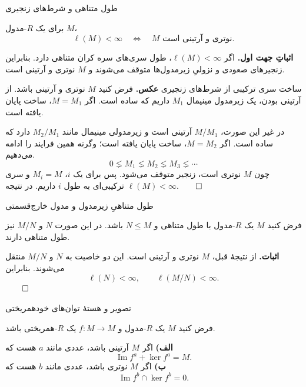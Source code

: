 \begin{frame}[t]{طول متناهی و شرط‌های زنجیری}
  \label{lec13:finite-length-chain-conditions}
  \begin{theorem}
    برای یک $R$-مدول $M$،
    \[
      \ell(M)<\infty
      \quad\Longleftrightarrow\quad
      M\text{ نوتری و آرتینی است.}
    \]
  \end{theorem}
  \textbf{اثباتِ جهت اول.}
  اگر $\ell(M)<\infty$، طول سری‌های سره کران متناهی دارد.
  بنابراین زنجیرهای صعودی و نزولیِ زیرمدول‌ها متوقف می‌شوند و $M$ نوتری و آرتینی است.
\end{frame}

\begin{frame}[t]{ساخت سری ترکیبی از شرط‌های زنجیری}
  \label{lec13:chain-conditions-converse}
  \textbf{عکس.} فرض کنید $M$ نوتری و آرتینی باشد.
  از آرتینی بودن، یک زیرمدول مینیمال $M_1$ داریم که ساده است.
  اگر $M=M_1$، ساخت پایان یافته است.
  \par\medskip
  در غیر این صورت، $M/M_1$ آرتینی است و زیرمدولی مینیمال مانند
  $M_2/M_1$ دارد که ساده است. اگر $M=M_2$، ساخت پایان یافته است؛
  وگرنه همین فرایند را ادامه می‌دهیم.
  \[
    0\lneq M_1\lneq M_2\lneq M_3\lneq\cdots
  \]
  چون $M$ نوتری است، زنجیر متوقف می‌شود. پس برای یک $i$، $M_i=M$ و
  سری ترکیبی‌ای به طول $i$ داریم. در نتیجه $\ell(M)<\infty$.\hfill$\qed$
\end{frame}

\begin{frame}[t]{طول متناهیِ زیرمدول و مدول خارج‌قسمتی}
  \label{lec13:finite-length-subquotients}
  \begin{corollary}
    فرض کنید $M$ یک $R$-مدول با طول متناهی و $N\leqslant M$ باشد.
    در این صورت $N$ و $M/N$ نیز طول متناهی دارند.
  \end{corollary}
  \textbf{اثبات.} از نتیجهٔ قبل، $M$ نوتری و آرتینی است.
  این دو خاصیت به $N$ و $M/N$ منتقل می‌شوند. بنابراین
  \[
    \ell(N)<\infty,
    \qquad
    \ell(M/N)<\infty.
  \]
  \hfill$\qed$
\end{frame}

\begin{frame}[t]{تصویر و هستهٔ توان‌های خودهمریختی}
  \label{lec13:eventual-image-kernel}
  \begin{theorem}
    فرض کنید $M$ یک $R$-مدول و $f:M\longrightarrow M$ یک $R$-همریختی باشد.
    \par\medskip
    \textbf{الف)} اگر $M$ آرتینی باشد، عددی مانند $a$ هست که
    \[
      \operatorname{Im}f^a+\ker f^a=M.
    \]
    \textbf{ب)} اگر $M$ نوتری باشد، عددی مانند $b$ هست که
    \[
      \operatorname{Im}f^b\cap\ker f^b=0.
    \]
  \end{theorem}
\end{frame}

